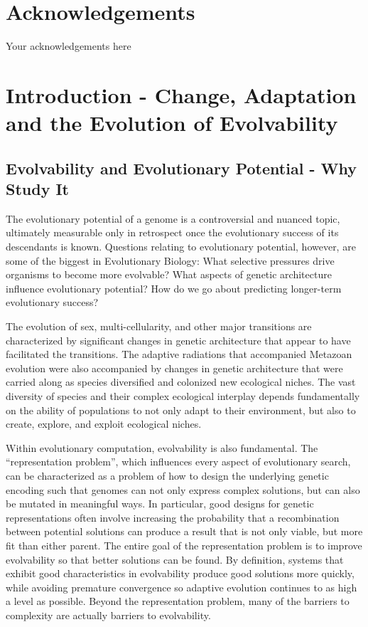 \documentclass[PhD]{msu-thesis}
\begin{document}
%
\clearpage
\makecopyrightpage
\makededicationpage
%
\clearpage
\chapter*{Acknowledgements}
\DoubleSpacing
Your acknowledgements here
%
\clearpage
\SingleSpacing
\tableofcontents*
\clearpage
\listoftables
\clearpage
\listoffigures
%
\mainmatter
\chapter{Introduction - Change, Adaptation and the Evolution of Evolvability}
\section{Evolvability and Evolutionary Potential - Why Study It} 
The evolutionary potential of a genome is a controversial and nuanced topic, ultimately measurable only in retrospect once the evolutionary success of its descendants is known. Questions relating to evolutionary potential, however, are some of the biggest in Evolutionary Biology: What selective pressures drive organisms to become more evolvable? What aspects of genetic architecture influence evolutionary potential? How do we go about predicting longer-term evolutionary success?

The evolution of sex, multi-cellularity, and other major transitions are characterized by significant changes in genetic architecture that appear to have facilitated the transitions\cite{smith_major_1995}. The adaptive radiations that accompanied Metazoan evolution were also accompanied by changes in genetic architecture that were carried along as species diversified and colonized new ecological niches\cite{kirschner_evolvability_1998}. The vast diversity of species and their complex ecological interplay depends fundamentally on the ability of populations to not only adapt to their environment, but also to create, explore, and exploit ecological niches.

Within evolutionary computation, evolvability is also fundamental. The ``representation problem'', which influences every aspect of evolutionary search, can be characterized as a problem of how to design the underlying genetic encoding such that genomes can not only express complex solutions, but can also be mutated in meaningful ways\cite{dawkins_13_2003}. In particular, good designs for genetic representations often involve increasing the probability that a recombination between potential solutions can produce a result that is not only viable, but more fit than either parent. The entire goal of the representation problem is to improve evolvability so that better solutions can be found. By definition, systems that exhibit good characteristics in evolvability produce good solutions more quickly, while avoiding premature convergence\cite{altenberg_evolution_1994} so adaptive evolution continues to as high a level as possible. Beyond the representation problem, many of the barriers to complexity are actually barriers to evolvability.
\end{document}
